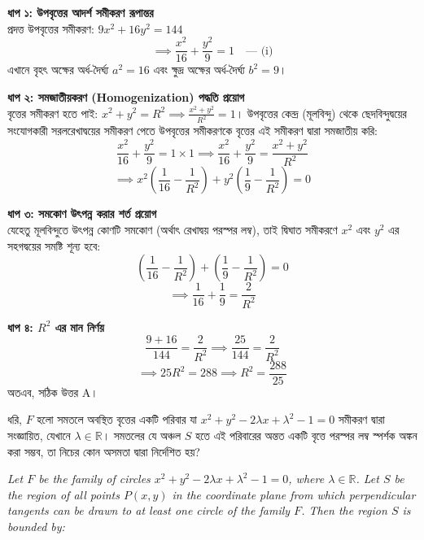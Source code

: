 \documentclass[12pt, a4paper]{article}
\begin{document}
\begin{tcolorbox}[solutionbox={সমাধান (Solution)}]
    \noindent
    \textbf{ধাপ ১: উপবৃত্তের আদর্শ সমীকরণ রূপান্তর} \\
    প্রদত্ত উপবৃত্তের সমীকরণ: $9x^2 + 16y^2 = 144$
    \[ \implies \frac{x^2}{16} + \frac{y^2}{9} = 1 \quad \text{--- (i)} \]
    এখানে বৃহৎ অক্ষের অর্ধ-দৈর্ঘ্য $a^2 = 16$ এবং ক্ষুদ্র অক্ষের অর্ধ-দৈর্ঘ্য $b^2 = 9$।
    
    \vspace{0.5em}
    \noindent\textbf{ধাপ ২: সমজাতীয়করণ (Homogenization) পদ্ধতি প্রয়োগ} \\
    বৃত্তের সমীকরণ হতে পাই: $x^2 + y^2 = R^2 \implies \frac{x^2 + y^2}{R^2} = 1$। 
    উপবৃত্তের কেন্দ্র (মূলবিন্দু) থেকে ছেদবিন্দুদ্বয়ের সংযোগকারী সরলরেখাদ্বয়ের সমীকরণ পেতে উপবৃত্তের সমীকরণকে বৃত্তের এই সমীকরণ দ্বারা সমজাতীয় করি:
    \[ \frac{x^2}{16} + \frac{y^2}{9} = 1 \times 1 \implies \frac{x^2}{16} + \frac{y^2}{9} = \frac{x^2 + y^2}{R^2} \]
    \[ \implies x^2 \left( \frac{1}{16} - \frac{1}{R^2} \right) + y^2 \left( \frac{1}{9} - \frac{1}{R^2} \right) = 0 \]
    
    \vspace{0.5em}
    \noindent\textbf{ধাপ ৩: সমকোণ উৎপন্ন করার শর্ত প্রয়োগ} \\
    যেহেতু মূলবিন্দুতে উৎপন্ন কোণটি সমকোণ (অর্থাৎ রেখাদ্বয় পরস্পর লম্ব), তাই দ্বিঘাত সমীকরণে $x^2$ এবং $y^2$ এর সহগদ্বয়ের সমষ্টি শূন্য হবে:
    \[ \left( \frac{1}{16} - \frac{1}{R^2} \right) + \left( \frac{1}{9} - \frac{1}{R^2} \right) = 0 \]
    \[ \implies \frac{1}{16} + \frac{1}{9} = \frac{2}{R^2} \]
    
    \vspace{0.5em}
    \noindent\textbf{ধাপ ৪: $R^2$ এর মান নির্ণয়} \\
    \[ \frac{9 + 16}{144} = \frac{2}{R^2} \implies \frac{25}{144} = \frac{2}{R^2} \]
    \[ \implies 25R^2 = 288 \implies R^2 = \frac{288}{25} \]
    অতএব, সঠিক উত্তর A।
\end{tcolorbox}
\begin{tcolorbox}[questionbox={প্রশ্ন (Question) 15}]
    \noindent
    ধরি, $F$ হলো সমতলে অবস্থিত বৃত্তের একটি পরিবার যা $x^2 + y^2 - 2\lambda x + \lambda^2 - 1 = 0$ সমীকরণ দ্বারা সংজ্ঞায়িত, যেখানে $\lambda \in \mathbb{R}$। সমতলের যে অঞ্চল $S$ হতে এই পরিবারের অন্তত একটি বৃত্তে পরস্পর লম্ব স্পর্শক অঙ্কন করা সম্ভব, তা নিচের কোন অসমতা দ্বারা নির্দেশিত হয়?
    
    \vspace{0.8em}
    \begin{english}
    \noindent\textit{\color{darkgray}
    Let $F$ be the family of circles $x^2 + y^2 - 2\lambda x + \lambda^2 - 1 = 0$, where $\lambda \in \mathbb{R}$. Let $S$ be the region of all points $P(x, y)$ in the coordinate plane from which perpendicular tangents can be drawn to at least one circle of the family $F$. Then the region $S$ is bounded by:
    }
    \end{english}
\end{tcolorbox}
\end{document}
